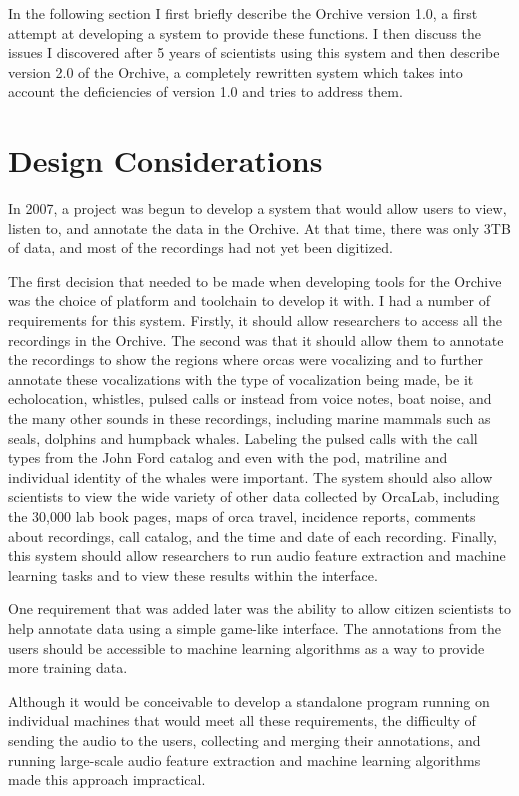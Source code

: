 In the following section I first briefly describe the Orchive version
1.0, a first attempt at developing a system to provide these
functions.  I then discuss the issues I discovered after 5 years of
scientists using this system and then describe version 2.0 of the
Orchive, a completely rewritten system which takes into account the
deficiencies of version 1.0 and tries to address them.


\section{Design Considerations}
\label{section:softwareAndSystems:designConsiderations}

In 2007, a project was begun to develop a system that would allow
users to view, listen to, and annotate the data in the Orchive.  At
that time, there was only 3TB of data, and most of the recordings had
not yet been digitized.

The first decision that needed to be made when developing tools for
the Orchive was the choice of platform and toolchain to develop it
with.  I had a number of requirements for this system.  Firstly, it
should allow researchers to access all the recordings in the Orchive.
The second was that it should allow them to annotate the recordings to
show the regions where orcas were vocalizing and to further annotate
these vocalizations with the type of vocalization being made, be it
echolocation, whistles, pulsed calls or instead from voice notes, boat
noise, and the many other sounds in these recordings, including marine
mammals such as seals, dolphins and humpback whales.  Labeling the
pulsed calls with the call types from the John Ford catalog and even
with the pod, matriline and individual identity of the whales were
important.  The system should also allow scientists to view the wide
variety of other data collected by OrcaLab, including the 30,000 lab
book pages, maps of orca travel, incidence reports, comments about
recordings, call catalog, and the time and date of each recording.
Finally, this system should allow researchers to run audio feature
extraction and machine learning tasks and to view these results within
the interface.

One requirement that was added later was the ability to allow citizen
scientists to help annotate data using a simple game-like interface.
The annotations from the users should be accessible to machine
learning algorithms as a way to provide more training data.

Although it would be conceivable to develop a standalone
program running on individual machines that would meet all these
requirements, the difficulty of sending the audio to the users,
collecting and merging their annotations, and running large-scale
audio feature extraction and machine learning algorithms made this
approach impractical.

